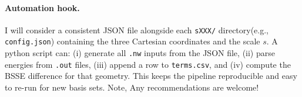 \paragraph{Automation hook.}
I will consider a consistent JSON file alongside each \texttt{sXXX/} directory(e.g., \texttt{config.json}) containing the three Cartesian coordinates and the scale \(s\). A python script can:
(i) generate all \texttt{.nw} inputs from the JSON file,
(ii) parse energies from \texttt{.out} files,
(iii) append a row to \texttt{terms.csv}, and
(iv) compute the BSSE difference for that geometry.
This keeps the pipeline reproducible and easy to re-run for new basis sets.
Note, Any recommendations are welcome!
